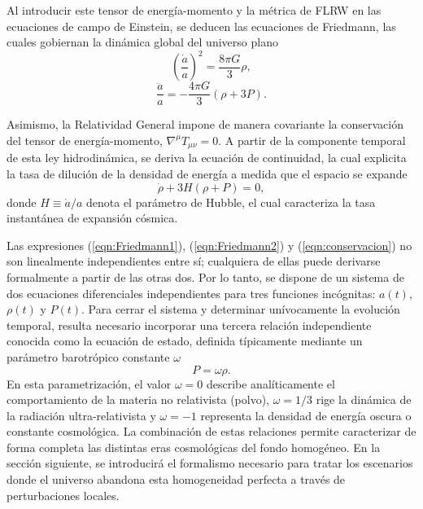 Al introducir este tensor de energía-momento y la métrica de FLRW en las ecuaciones de campo de Einstein, se deducen las ecuaciones de Friedmann, las cuales gobiernan la dinámica global del universo plano \cite{Weinberg, Doddelson}
\begin{equation}\label{eqn:Friedmann1}
    \left(\frac{\dot{a}}{a}\right)^2 = \frac{8\pi G}{3} \rho,
\end{equation}
\begin{equation}\label{eqn:Friedmann2}
    \frac{\ddot{a}}{a} = - \frac{4\pi G}{3} \left( \rho + 3 P \right).
\end{equation}

Asimismo, la Relatividad General impone de manera covariante la conservación del tensor de energía-momento, $\nabla^\mu T_{\mu\nu} = 0$. A partir de la componente temporal de esta ley hidrodinámica, se deriva la ecuación de continuidad, la cual explicita la tasa de dilución de la densidad de energía a medida que el espacio se expande \cite{Baumann_2012}
\begin{equation}\label{eqn:conservacion}
    \dot{\rho} + 3 H \left( \rho + P \right) = 0,
\end{equation}
donde $H \equiv \dot{a}/a$ denota el parámetro de Hubble, el cual caracteriza la tasa instantánea de expansión cósmica.

Las expresiones (\ref{eqn:Friedmann1}), (\ref{eqn:Friedmann2}) y (\ref{eqn:conservacion}) no son linealmente independientes entre sí; cualquiera de ellas puede derivarse formalmente a partir de las otras dos. Por lo tanto, se dispone de un sistema de dos ecuaciones diferenciales independientes para tres funciones incógnitas: $a(t)$, $\rho(t)$ y $P(t)$. Para cerrar el sistema y determinar unívocamente la evolución temporal, resulta necesario incorporar una tercera relación independiente conocida como la ecuación de estado, definida típicamente mediante un parámetro barotrópico constante $\omega$ \cite{Baumann_2012}
\begin{equation}
    P = \omega \rho.
\end{equation}
En esta parametrización, el valor $\omega = 0$ describe analíticamente el comportamiento de la materia no relativista (polvo), $\omega = 1/3$ rige la dinámica de la radiación ultra-relativista y $\omega = -1$ representa la densidad de energía oscura o constante cosmológica. La combinación de estas relaciones permite caracterizar de forma completa las distintas eras cosmológicas del fondo homogéneo. En la sección siguiente, se introducirá el formalismo necesario para tratar los escenarios donde el universo abandona esta homogeneidad perfecta a través de perturbaciones locales.

